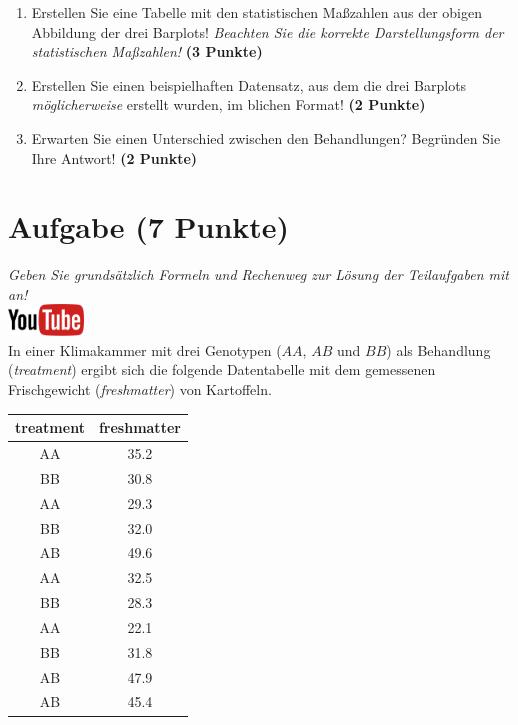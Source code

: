 \documentclass[a4paper, 9pt]{scrartcl}\usepackage[]{graphicx}\usepackage[]{xcolor}
\begin{document}
\begin{enumerate}
\item Erstellen Sie eine Tabelle mit den statistischen Ma{\ss}zahlen aus der
  obigen Abbildung der drei Barplots! \textit{Beachten Sie die korrekte
    Darstellungsform der statistischen Ma{\ss}zahlen!} \textbf{(3 Punkte)}
\item Erstellen Sie einen beispielhaften Datensatz, aus dem die drei
  Barplots \textit{m{\"o}glicherweise} erstellt wurden, im blichen Format! \textbf{(2 Punkte)}
\item Erwarten Sie einen Unterschied zwischen den Behandlungen? Begr{\"u}nden
  Sie Ihre Antwort! \textbf{(2 Punkte)}
\end{enumerate} 
\clearpage

\section{Aufgabe \hfill (7 Punkte)}

\textit{Geben Sie grunds{\"a}tzlich Formeln und Rechenweg zur L{\"o}sung der
  Teilaufgaben mit an!} \\[1Ex]

\hfill\href{https://youtu.be/vXnLttRL_VI}{\includegraphics[width =
  2cm]{img/youtube}}\\[1Ex]



In einer Klimakammer mit drei Genotypen ($AA$, $AB$ und $BB$) als Behandlung
(\textit{treatment}) ergibt sich die folgende Datentabelle mit dem
gemessenen Frischgewicht (\textit{freshmatter}) von Kartoffeln.

\begin{table}[!h]
\centering
\begin{tabular}{cc}
\toprule
treatment & freshmatter\\
\midrule
AA & 35.2\\
BB & 30.8\\
AA & 29.3\\
BB & 32.0\\
AB & 49.6\\
\addlinespace
AA & 32.5\\
BB & 28.3\\
AA & 22.1\\
BB & 31.8\\
AB & 47.9\\
\addlinespace
AB & 45.4\\
\bottomrule
\end{tabular}
\end{table}
\end{document}
